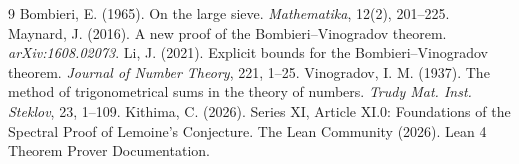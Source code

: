 \documentclass[11pt,a4paper]{article}
\begin{document}

\begin{thebibliography}{9}
  Bombieri, E. (1965). On the large sieve. \emph{Mathematika}, 12(2), 201–225.
  Maynard, J. (2016). A new proof of the Bombieri–Vinogradov theorem. \emph{arXiv:1608.02073}.
  Li, J. (2021). Explicit bounds for the Bombieri–Vinogradov theorem. \emph{Journal of Number Theory}, 221, 1–25.
  Vinogradov, I. M. (1937). The method of trigonometrical sums in the theory of numbers. \emph{Trudy Mat. Inst. Steklov}, 23, 1–109.
  Kithima, C. (2026). Series XI, Article XI.0: Foundations of the Spectral Proof of Lemoine's Conjecture.
  The Lean Community (2026). Lean 4 Theorem Prover Documentation.
\end{thebibliography}
\end{document}
